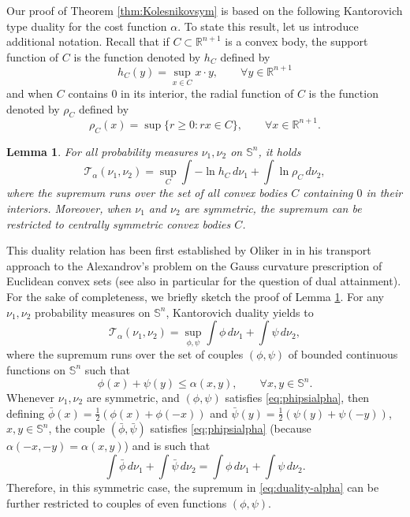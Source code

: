\documentclass[10pt]{amsart}
\newtheorem{lem}[thm]{Lemma}
\theoremstyle{definition}
\theoremstyle{remark}
\newcommand{\R}{\mathbb{R}}
\begin{document}
Our proof of Theorem \ref{thm:Kolesnikovsym} is based on the following Kantorovich type duality for the cost function $\alpha$. 
To state this result, let us introduce additional notation. Recall that if $C \subset \mathbb{R}^{n+1}$ is a convex body, the support function of $C$ is the function denoted by $h_C$ defined by 
\[
h_C(y) = \sup_{x \in C} x\cdot y,\qquad \forall y \in \R^{n+1}
\]
and when $C$ contains $0$ in its interior, the radial function of $C$ is the function denoted by $\rho_C$ defined by 
\[
\rho_C(x) = \sup\{ r \geq 0 : rx \in C\},\qquad \forall x\in \R^{n+1}.
\]
\begin{lem}\label{lem:Oliker}
For all probability measures $\nu_1,\nu_2$ on $\mathbb{S}^n$, it holds
\[
\mathcal{T}_\alpha(\nu_1,\nu_2) = \sup_{C} \int -\ln h_C\,d\nu_1+\int \ln \rho_C\,d\nu_2,
\]
where the supremum runs over the set of all convex bodies $C$ containing $0$ in their interiors.
Moreover, when $\nu_1$ and $\nu_2$ are symmetric, the supremum can be restricted to centrally symmetric convex bodies $C$.
\end{lem}
This duality relation has been first established by Oliker in \cite{Olik07} in his transport approach to the Alexandrov's problem on the Gauss curvature prescription of Euclidean convex sets (see also \cite{Ber16} in particular for the question of dual attainment). 
For the sake of completeness, we briefly sketch the proof of Lemma \ref{lem:Oliker}.
\proof
For any $\nu_1,\nu_2$ probability measures on $\mathbb{S}^n$, Kantorovich duality \cite[Theorem 5.10 (i)]{villani_book} yields to 
\begin{equation}\label{eq:duality-alpha}
\mathcal{T}_\alpha(\nu_1,\nu_2) = \sup_{\phi,\psi} \int \phi\,d\nu_1+\int \psi\,d\nu_2,
\end{equation}
where the supremum runs over the set of couples $(\phi,\psi)$ of bounded continuous functions on $\mathbb{S}^n$ such that 
\begin{equation}\label{eq:phipsialpha}
\phi(x)+\psi(y) \leq  \alpha(x,y),\qquad \forall x,y \in  \mathbb{S}^n.
\end{equation}
Whenever $\nu_1,\nu_2$ are symmetric, and $(\phi,\psi)$ satisfies \eqref{eq:phipsialpha}, then defining $\bar{\phi}(x) = \frac{1}{2}(\phi(x) + \phi(-x))$ and $\bar{\psi}(y) =  \frac{1}{2}(\psi(y) + \psi(-y))$, $x,y\in\mathbb{S}^n$, the couple $(\bar{\phi},\bar{\psi})$ satisfies \eqref{eq:phipsialpha} (because $\alpha(-x,-y) = \alpha(x,y)$) and is such that 
\[
\int \bar{\phi}\,d\nu_1 + \int \bar{\psi}\,d\nu_2  = \int \phi\,d\nu_1 + \int \psi\,d\nu_2. 
\]
Therefore, in this symmetric case, the supremum in \eqref{eq:duality-alpha} can be further restricted to couples of even functions $(\phi,\psi)$. 
\end{document}
